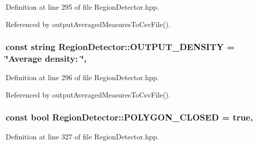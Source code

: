 Definition at line 295 of file Region\-Detector.\-hpp.



Referenced by output\-Averaged\-Measures\-To\-Csv\-File().

\hypertarget{classmultiscale_1_1analysis_1_1RegionDetector_ad432faee394557fc48ff6baaceddf1cb}{
\subsubsection[{O\-U\-T\-P\-U\-T\-\_\-\-D\-E\-N\-S\-I\-T\-Y}]{\setlength{\rightskip}{0pt plus 5cm}const string Region\-Detector\-::\-O\-U\-T\-P\-U\-T\-\_\-\-D\-E\-N\-S\-I\-T\-Y = \char`\"{}Average density\-: \char`\"{}\hspace{0.3cm}{\ttfamily [static]}, {\ttfamily [private]}}}\label{classmultiscale_1_1analysis_1_1RegionDetector_ad432faee394557fc48ff6baaceddf1cb}


Definition at line 296 of file Region\-Detector.\-hpp.



Referenced by output\-Averaged\-Measures\-To\-Csv\-File().

\hypertarget{classmultiscale_1_1analysis_1_1RegionDetector_a1b3de2646beaac60d03527f1775614be}{
\subsubsection[{P\-O\-L\-Y\-G\-O\-N\-\_\-\-C\-L\-O\-S\-E\-D}]{\setlength{\rightskip}{0pt plus 5cm}const bool Region\-Detector\-::\-P\-O\-L\-Y\-G\-O\-N\-\_\-\-C\-L\-O\-S\-E\-D = true\hspace{0.3cm}{\ttfamily [static]}, {\ttfamily [private]}}}\label{classmultiscale_1_1analysis_1_1RegionDetector_a1b3de2646beaac60d03527f1775614be}


Definition at line 327 of file Region\-Detector.\-hpp.



